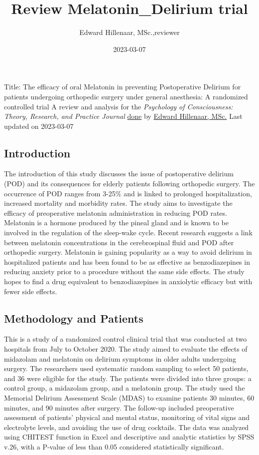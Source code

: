 \documentclass[
]{article}
\title{Review Melatonin\_Delirium trial}
\author{Edward Hillenaar, MSc.,reviewer}
\date{2023-03-07}
\begin{document}
\maketitle

Title: The efficacy of oral Melatonin in preventing Postoperative
Delirium for patients undergoing orthopedic surgery under general
anesthesia: A randomized controlled trial A review and analysis for the
\emph{Psychology of Consciousness: Theory, Research, and Practice
Journal}
\href{https://github.com/EdwardHill15/Melatonin_Delirium_trial}{done} by
\href{mailto:\%20totalegezondheidbv@gmail.com}{Edward Hillenaar, MSc.}
Last updated on 2023-03-07

\hypertarget{introduction}{%
\subsection{Introduction}\label{introduction}}

The introduction of this study discusses the issue of postoperative
delirium (POD) and its consequences for elderly patients following
orthopedic surgery. The occurrence of POD ranges from 3-25\% and is
linked to prolonged hospitalization, increased mortality and morbidity
rates. The study aims to investigate the efficacy of preoperative
melatonin administration in reducing POD rates. Melatonin is a hormone
produced by the pineal gland and is known to be involved in the
regulation of the sleep-wake cycle. Recent research suggests a link
between melatonin concentrations in the cerebrospinal fluid and POD
after orthopedic surgery. Melatonin is gaining popularity as a way to
avoid delirium in hospitalized patients and has been found to be as
effective as benzodiazepines in reducing anxiety prior to a procedure
without the same side effects. The study hopes to find a drug equivalent
to benzodiazepines in anxiolytic efficacy but with fewer side effects.

\hypertarget{methodology-and-patients}{%
\subsection{Methodology and Patients}\label{methodology-and-patients}}

This is a study of a randomized control clinical trial that was
conducted at two hospitals from July to October 2020. The study aimed to
evaluate the effects of midazolam and melatonin on delirium symptoms in
older adults undergoing surgery. The researchers used systematic random
sampling to select 50 patients, and 36 were eligible for the study. The
patients were divided into three groups: a control group, a midazolam
group, and a melatonin group. The study used the Memorial Delirium
Assessment Scale (MDAS) to examine patients 30 minutes, 60 minutes, and
90 minutes after surgery. The follow-up included preoperative assessment
of patients' physical and mental status, monitoring of vital signs and
electrolyte levels, and avoiding the use of drug cocktails. The data was
analyzed using CHITEST function in Excel and descriptive and analytic
statistics by SPSS v.26, with a P-value of less than 0.05 considered
statistically significant.
\end{document}
